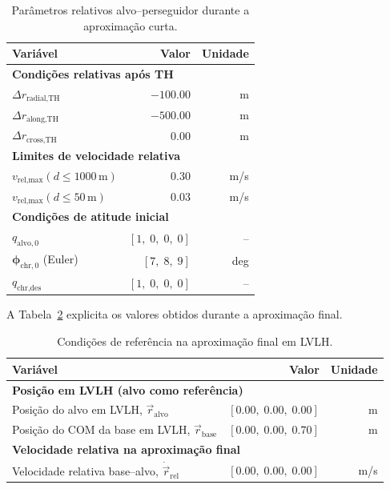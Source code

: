 \begin{table}[H]
\centering
\renewcommand{\arraystretch}{1.2}
\caption{Parâmetros relativos alvo--perseguidor durante a aproximação curta.}
\label{tab:parametros_pos_TH}
\begin{tabular}{lrr}
\hline
\textbf{Variável} & \textbf{Valor} & \textbf{Unidade} \\
\hline
\multicolumn{3}{l}{\textbf{Condições relativas após TH}} \\
\hline
$\Delta r_{\text{radial,TH}}$& $-100.00$& m \\
$\Delta r_{\text{along,TH}}$& $-500.00$& m \\
$\Delta r_{\text{cross,TH}}$& $0.00$& m \\
\hline
\multicolumn{3}{l}{\textbf{Limites de velocidade relativa}} \\
\hline
$v_{\text{rel,max}}(d \leq 1000\,\text{m})$ & $0.30$ & m/s \\
$v_{\text{rel,max}}(d \leq 50\,\text{m})$& $0.03$ & m/s \\
\hline
\multicolumn{3}{l}{\textbf{Condições de atitude inicial}} \\
\hline
$q_{\text{alvo},0}$& $[1,\;0,\;0,\;0]$ & -- \\
$\boldsymbol{\phi}_{\text{chr},0}$ (Euler) & $[7,\;8,\;9]$     & deg \\
$q_{\text{chr,des}}$& $[1,\;0,\;0,\;0]$ & -- \\
\hline
\end{tabular}
\end{table}

A Tabela~\ref{tab:aproximacao_final} explicita os valores obtidos durante a aproximação final.
\begin{table}[H]
\centering
\renewcommand{\arraystretch}{1.2}
\caption{Condições de referência na aproximação final em LVLH.}
\label{tab:aproximacao_final}
\begin{tabular}{lrr}
\hline
\textbf{Variável} & \textbf{Valor} & \textbf{Unidade} \\
\hline
\multicolumn{3}{l}{\textbf{Posição em LVLH (alvo como referência)}} \\
\hline
Posição do alvo em LVLH, $\vec r_{\text{alvo}}$ &
$[0.00,\;0.00,\;0.00]$ & m \\
Posição do COM da base em LVLH, $\vec r_{\text{base}}$ &
$[0.00,\;0.00,\;0.70]$ & m \\
\hline
\multicolumn{3}{l}{\textbf{Velocidade relativa na aproximação final}} \\
\hline
Velocidade relativa base–alvo, $\dot{\vec r}_{\text{rel}}$ &
$[0.00,\;0.00,\;0.00]$ & m/s \\
\hline
\end{tabular}
\end{table}
